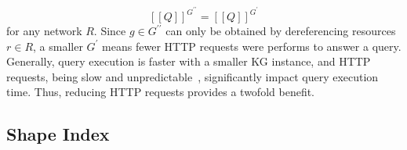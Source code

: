 \begin{equation}\label{eq:evalQueryStructuralAssumption}
   [\![ Q ]\!]^{G^{\prime\prime}} = [\![ Q ]\!]^{G^{\prime}}
\end{equation}
for any network $R$.
Since $g \in G^{\prime\prime}$ can only be obtained by dereferencing resources $r \in R$, a smaller $G^\prime$ means fewer HTTP requests were performs to answer a query.  
Generally, query execution is faster with a smaller KG instance, and HTTP requests, being slow and unpredictable~\cite{hartig2016walking}, significantly impact query execution time.  
Thus, reducing HTTP requests provides a twofold benefit.

\subsection{Shape Index}

